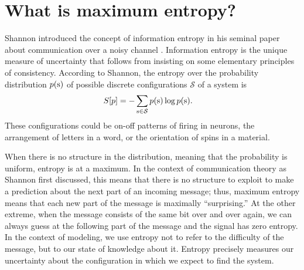 \documentclass[aps,prl,twocolumn,nofootinbib]{revtex4-1}
\begin{document}

\section{What is maximum entropy?}
Shannon introduced the concept of information entropy in his seminal paper about communication over a noisy channel \cite{Shannon:1948wk}. Information entropy is the unique measure of uncertainty that follows from insisting on some elementary principles of consistency. According to Shannon, the entropy over the probability distribution $p({\rm s})$ of possible discrete configurations $\mathcal S$ of a system is
\begin{align}
	S[p] &= -\sum_{{\rm s}\in \mathcal{S}} p({\rm s}) \log p({\rm s}).
\end{align}
These configurations could be on-off patterns of firing in neurons, the arrangement of letters in a word, or the orientation of spins in a material.

When there is no structure in the distribution, meaning that the probability is uniform, entropy is at a maximum. In the context of communication theory as Shannon first discussed, this means that there is no structure to exploit to make a prediction about the next part of an incoming message; thus, maximum entropy means that each new part of the message is maximally ``surprising.'' At the other extreme, when the message consists of the same bit over and over again, we can always guess at the following part of the message and the signal has zero entropy. In the context of modeling, we use entropy not to refer to the difficulty of the message, but to our state of knowledge about it. Entropy precisely measures our uncertainty about the configuration in which we expect to find the system.
\end{document}
